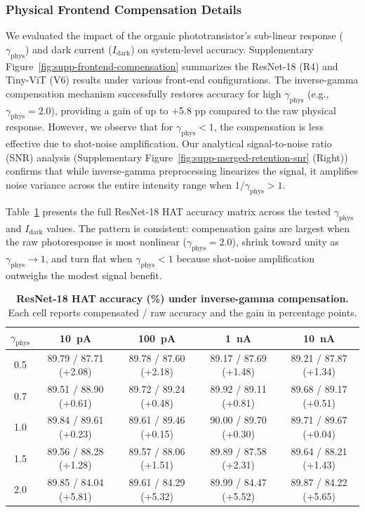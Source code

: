 \subsubsection{Physical Frontend Compensation Details}

We evaluated the impact of the organic phototransistor's sub-linear response ($\gamma_{\mathrm{phys}}$) and dark current ($I_{\text{dark}}$) on system-level accuracy. Supplementary Figure~\ref{fig:supp-frontend-compensation} summarizes the ResNet-18 (R4) and Tiny-ViT (V6) results under various front-end configurations. The inverse-gamma compensation mechanism successfully restores accuracy for high $\gamma_{\mathrm{phys}}$ (e.g., $\gamma_{\mathrm{phys}}=2.0$), providing a gain of up to +5.8 pp compared to the raw physical response. However, we observe that for $\gamma_{\mathrm{phys}} < 1$, the compensation is less effective due to shot-noise amplification. Our analytical signal-to-noise ratio (SNR) analysis (Supplementary Figure~\ref{fig:supp-merged-retention-snr} (Right)) confirms that while inverse-gamma preprocessing linearizes the signal, it amplifies noise variance across the entire intensity range when $1/\gamma_{\mathrm{phys}} > 1$.

Table~\ref{tab:supp-frontend-gamma-scan} presents the full ResNet-18 HAT accuracy matrix across the tested $\gamma_{\mathrm{phys}}$ and $I_{\text{dark}}$ values. The pattern is consistent: compensation gains are largest when the raw photoresponse is most nonlinear ($\gamma_{\mathrm{phys}}=2.0$), shrink toward unity as $\gamma_{\mathrm{phys}} \rightarrow 1$, and turn flat when $\gamma_{\mathrm{phys}} < 1$ because shot-noise amplification outweighs the modest signal benefit.

\begin{table}[ht]
    \centering
    \caption{\textbf{ResNet-18 HAT accuracy (\%) under inverse-gamma compensation.} Each cell reports compensated / raw accuracy and the gain in percentage points.}
    \label{tab:supp-frontend-gamma-scan}
    \small
    \setlength{\tabcolsep}{4pt}
    \begin{tabular}{c|cccc}
        \toprule
        $\gamma_{\mathrm{phys}}$ & 10~pA & 100~pA & 1~nA & 10~nA \\
        \midrule
        0.5 & 89.79 / 87.71 (+2.08) & 89.78 / 87.60 (+2.18) & 89.17 / 87.69 (+1.48) & 89.21 / 87.87 (+1.34) \\
        0.7 & 89.51 / 88.90 (+0.61) & 89.72 / 89.24 (+0.48) & 89.92 / 89.11 (+0.81) & 89.68 / 89.17 (+0.51) \\
        1.0 & 89.84 / 89.61 (+0.23) & 89.61 / 89.46 (+0.15) & 90.00 / 89.70 (+0.30) & 89.71 / 89.67 (+0.04) \\
        1.5 & 89.56 / 88.28 (+1.28) & 89.57 / 88.06 (+1.51) & 89.89 / 87.58 (+2.31) & 89.64 / 88.21 (+1.43) \\
        2.0 & 89.85 / 84.04 (+5.81) & 89.61 / 84.29 (+5.32) & 89.99 / 84.47 (+5.52) & 89.87 / 84.22 (+5.65) \\
        \bottomrule
    \end{tabular}
\end{table}


